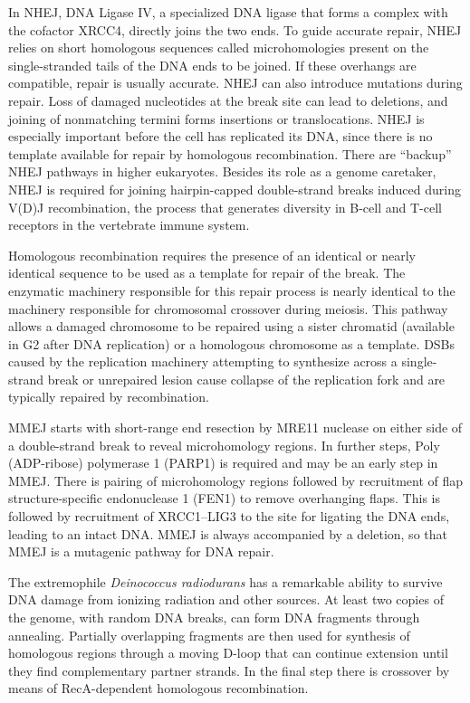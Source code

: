 In NHEJ, DNA Ligase IV, a specialized DNA ligase that forms a complex with the cofactor XRCC4, directly joins the two ends. To guide accurate repair, NHEJ relies on short homologous sequences called microhomologies present on the single-stranded tails of the DNA ends to be joined. If these overhangs are compatible, repair is usually accurate. NHEJ can also introduce mutations during repair. Loss of damaged nucleotides at the break site can lead to deletions, and joining of nonmatching termini forms insertions or translocations. NHEJ is especially important before the cell has replicated its DNA, since there is no template available for repair by homologous recombination. There are ``backup'' NHEJ pathways in higher eukaryotes. Besides its role as a genome caretaker, NHEJ is required for joining hairpin-capped double-strand breaks induced during V(D)J recombination, the process that generates diversity in B-cell and T-cell receptors in the vertebrate immune system.

Homologous recombination requires the presence of an identical or nearly identical sequence to be used as a template for repair of the break. The enzymatic machinery responsible for this repair process is nearly identical to the machinery responsible for chromosomal crossover during meiosis. This pathway allows a damaged chromosome to be repaired using a sister chromatid (available in G2 after DNA replication) or a homologous chromosome as a template. DSBs caused by the replication machinery attempting to synthesize across a single-strand break or unrepaired lesion cause collapse of the replication fork and are typically repaired by recombination.

MMEJ starts with short-range end resection by MRE11 nuclease on either side of a double-strand break to reveal microhomology regions. In further steps, Poly (ADP-ribose) polymerase 1 (PARP1) is required and may be an early step in MMEJ. There is pairing of microhomology regions followed by recruitment of flap structure-specific endonuclease 1 (FEN1) to remove overhanging flaps. This is followed by recruitment of XRCC1--LIG3 to the site for ligating the DNA ends, leading to an intact DNA. MMEJ is always accompanied by a deletion, so that MMEJ is a mutagenic pathway for DNA repair.

The extremophile \emph{Deinococcus radiodurans} has a remarkable ability to survive DNA damage from ionizing radiation and other sources. At least two copies of the genome, with random DNA breaks, can form DNA fragments through annealing. Partially overlapping fragments are then used for synthesis of homologous regions through a moving D-loop that can continue extension until they find complementary partner strands. In the final step there is crossover by means of RecA-dependent homologous recombination.

